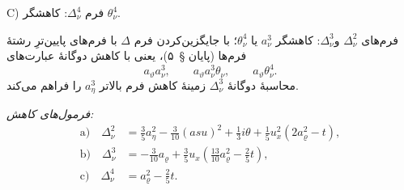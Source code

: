 \documentclass[11pt]{article}
\providecommand{\A}{\Delta}
\providecommand{\R}{\varrho}
\begin{document}
\noindent C) فرم $\A_\nu^4$: کاهشگر $\theta_\nu^4$.

فرم‌های $\A_\nu^2$ و$\A_\nu^3$: کاهشگر $a_\nu^3$ یا $\theta_\nu^4$؛ با جایگزین‌کردن فرم $\A$ با فرم‌های پایین‌ترِ رشتهٔ فرم‌ها (پایان \S\ ۵)، یعنی با کاهش دوگانهٔ عبارت‌های
\[
a_\vartheta a_\nu^3,\qquad
a_\vartheta a_\nu^3\theta_\nu,\qquad
a_\vartheta\theta_\nu^4.
\]
محاسبهٔ دوگانهٔ $\A_\nu^3$ زمینهٔ کاهش فرم بالاتر $a_\eta^3$ را فراهم می‌کند.

\noindent\emph{فرمول‌های کاهش:}
\[
\tag{10}
\begin{aligned}
\text{a)}\quad \A_\nu^2
&=\frac35a_\eta^2-\frac3{10}(asu)^2+\frac13 i\theta
+\frac15u_x^2(2a_\R^2-t),\\
\text{b)}\quad \A_\nu^3
&=-\frac3{10}a_\R+\frac35u_x\left(\frac{13}{10}a_\R^2-\frac25t\right),\\
\text{c)}\quad \A_\nu^4&=a_\R^2-\frac25t.
\end{aligned}
\]
\end{document}
